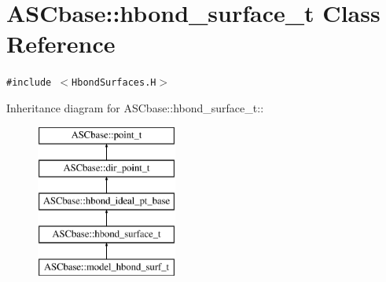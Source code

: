 \section{ASCbase::hbond\_\-surface\_\-t Class Reference}
\label{classASCbase_1_1hbond__surface__t}
{\tt \#include $<$Hbond\-Surfaces.H$>$}

Inheritance diagram for ASCbase::hbond\_\-surface\_\-t::\begin{figure}[H]
\begin{center}
\leavevmode
\includegraphics[height=5cm]{classASCbase_1_1hbond__surface__t}
\end{center}
\end{figure}
